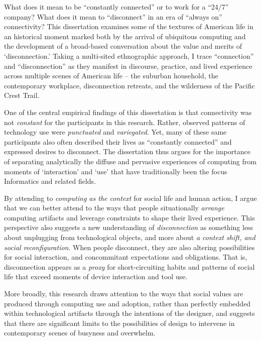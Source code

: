 \thesisabstract
{
What does it mean to be “constantly connected” or to work for a “24/7” company? What does it mean to ``disconnect'' in an era of “always on” connectivity? This dissertation examines some of the textures of American life in an historical moment marked both by the arrival of ubiquitous computing and the development of a broad-based conversation about the value and merits of ‘disconnection.’ Taking a multi-sited ethnographic approach, I trace ``connection'' and ``disconnection'' as they manifest in discourse, practice, and lived experience across multiple scenes of American life -- the suburban household, the contemporary workplace, disconnection retreats, and the wilderness of the Pacific Crest Trail.

One of the central empirical findings of this dissertation is that connectivity was not \emph{constant} for the participants in this research. Rather, observed patterns of technology use were \emph{punctuated} and \emph{variegated}. Yet, many of these same participants also often described their lives as ``constantly connected'' and expressed desires to disconnect. The dissertation thus argues for the importance of separating analytically the diffuse and pervasive experiences of computing from moments of ‘interaction’ and ‘use’ that have traditionally been the focus Informatics and related fields.

By attending to \emph{computing as the context} for social life and human action, I argue that we can better attend to the ways that people situationally \emph{arrange} computing artifacts and leverage constraints to shape their lived experience. This perspective also suggests a new understanding of \emph{disconnection} as something less about unplugging from technological objects, and more about \emph{a context shift, and social reconfiguration}. When people disconnect, they are also altering possibilities for social interaction, and concommitant expectations and obligations. That is, disconnection appears as a \emph{proxy} for short-circuiting habits and patterns of social life that exceed moments of device interaction and tool use.

More broadly, this research draws attention to the ways that social values are produced through computing use and adoption, rather than perfectly embedded within technological artifacts through the intentions of the designer, and suggests that there are significant limits to the possibilities of design to intervene in contemporary scenes of busyness and overwhelm.
}


